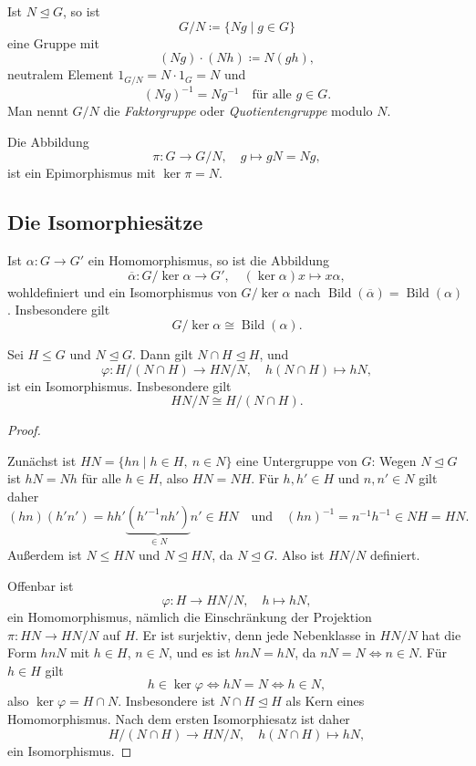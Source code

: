 \documentclass[11pt]{article}
\begin{document}
\begin{definition}[Faktorgruppe]\Theorem
  Ist $N \trianglelefteq G$, so ist
  \[ G/N \coloneqq \{Ng \mid g \in G\} \]
  eine Gruppe mit
  \[ (Ng) \cdot (Nh) \coloneqq N(gh), \]
  neutralem Element $1_{G/N} = N \cdot 1_G = N$ und
  \[ (Ng)^{-1} = Ng^{-1} \quad \text{für alle } g \in G. \]
  Man nennt $G/N$ die \emph{Faktorgruppe} oder \emph{Quotientengruppe} modulo $N$.
\end{definition}

Die Abbildung
\[ \pi\colon G \longrightarrow G/N, \quad g \longmapsto gN = Ng, \]
ist ein Epimorphismus mit $\ker \pi = N$.

\subsection{Die Isomorphiesätze}

\begin{theorem}\Theorem
  Ist $\alpha\colon G \to G'$ ein Homomorphismus, so ist die Abbildung
  \[ \overline{\alpha}\colon G/\ker\alpha \longrightarrow G', \quad (\ker\alpha)x \longmapsto x\alpha, \]
  wohldefiniert und ein Isomorphismus von $G/\ker\alpha$ nach $\operatorname{Bild}(\overline{\alpha}) = \operatorname{Bild}(\alpha)$. Insbesondere gilt
  \[ G/\ker\alpha \cong \operatorname{Bild}(\alpha). \]
\end{theorem}

\begin{theorem}\Theorem
  Sei $H \le G$ und $N \trianglelefteq G$. Dann gilt $N \cap H \trianglelefteq H$, und
  \[ \varphi\colon H/(N \cap H) \longrightarrow HN/N, \quad h(N \cap H) \longmapsto hN, \]
  ist ein Isomorphismus. Insbesondere gilt
  \[ HN/N \cong H/(N \cap H). \]
\end{theorem}
\begin{proof}
\begin{ergaenzung}
  Zunächst ist $HN = \{hn \mid h \in H,\ n \in N\}$ eine Untergruppe von $G$: Wegen $N \trianglelefteq G$ ist $hN = Nh$ für alle $h \in H$, also $HN = NH$. Für $h, h' \in H$ und $n, n' \in N$ gilt daher
  \[ (hn)(h'n') = hh' \underbrace{(h'^{-1}nh')}_{\in N} n' \in HN
  \quad \text{und} \quad
  (hn)^{-1} = n^{-1}h^{-1} \in NH = HN. \]
  Außerdem ist $N \le HN$ und $N \trianglelefteq HN$, da $N \trianglelefteq G$. Also ist $HN/N$ definiert.
\end{ergaenzung}

  Offenbar ist
  \[ \varphi\colon H \longrightarrow HN/N, \quad h \longmapsto hN, \]
  ein Homomorphismus, nämlich die Einschränkung der Projektion $\pi\colon HN \to HN/N$ auf $H$.
  Er ist surjektiv, denn jede Nebenklasse in $HN/N$ hat die Form $hnN$ mit $h \in H$, $n \in N$, und es ist $hnN = hN$, da $nN = N \iff n \in N$.
  Für $h \in H$ gilt
  \[ h \in \ker\varphi \iff hN = N \iff h \in N, \]
  also $\ker \varphi = H \cap N$. Insbesondere ist $N \cap H \trianglelefteq H$ als Kern eines Homomorphismus.
  Nach dem ersten Isomorphiesatz ist daher
  \[ H/(N \cap H) \longrightarrow HN/N, \quad h(N \cap H) \longmapsto hN, \]
  ein Isomorphismus.
\end{proof}
\end{document}
